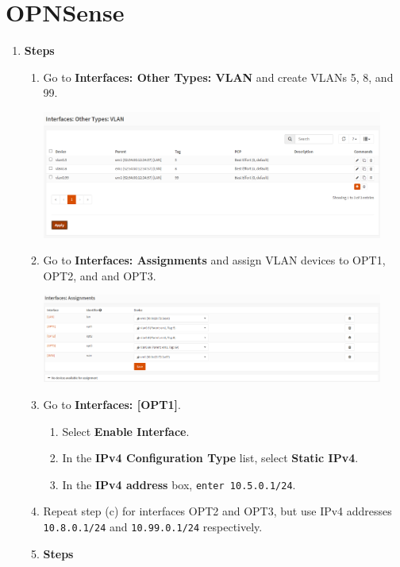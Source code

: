 \documentclass[12pt, a4paper]{article}
\begin{document}
  \section*{OPNSense}
  \begin{enumerate}[resume]
    \item
    \textbf{Steps}
    \begin{enumerate}
      \item Go to \textbf{Interfaces: Other Types: VLAN} and create VLANs 5, 8, and 99.

      \includegraphics[width=0.93\textwidth]{5_interfaces_other_types_vlan.png}

      \item Go to \textbf{Interfaces: Assignments} and assign VLAN devices to OPT1, OPT2, and and OPT3.

      \includegraphics[width=0.93\textwidth]{5_interfaces_assignments}

      \item Go to \textbf{Interfaces: [OPT1]}.
      \begin{enumerate}
        \item Select \textbf{Enable Interface}.
        \item In the \textbf{IPv4 Configuration Type} list, select \textbf{Static IPv4}.
        \item In the \textbf{IPv4 address} box, \verb|enter 10.5.0.1/24|.
      \end{enumerate}
      \item Repeat step (c) for interfaces OPT2 and OPT3, but use IPv4 addresses
      \verb|10.8.0.1/24| and \verb|10.99.0.1/24| respectively.

      \item \textbf{Steps}


\end{enumerate}
\end{enumerate}
\end{document}
